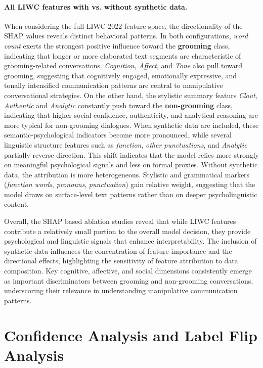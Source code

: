 \paragraph{All LIWC features with vs. without synthetic data.}
When considering the full LIWC-2022 feature space, the directionality of the SHAP values reveals distinct behavioral patterns. In both configurations, \textit{word count} exerts the strongest positive influence toward the \textbf{grooming} class, indicating that longer or more elaborated text segments are characteristic of grooming-related conversations. \textit{Cognition}, \textit{Affect}, and \textit{Tone} also pull toward grooming, suggesting that cognitively engaged, emotionally expressive, and tonally intensified communication patterns are central to manipulative conversational strategies. On the other hand, the stylistic summary featurs \textit{Clout}, \textit{Authentic} and \textit{Analytic} constantly push toward the \textbf{non-grooming} class, indicating that higher social confidence, authenticity, and analytical reasoning are more typical for non-grooming dialogues. When synthetic data are included, these semantic-psychological indicators become more pronounced, while several linguistic structure features such as \textit{function}, \textit{other punctuations}, and \textit{Analytic} partially reverse direction. This shift indicates that the model relies more strongly on meaningful psychological signals and less on formal proxies. Without synthetic data, the attribution is more heterogeneous. Stylistic and grammatical markers (\textit{function words}, \textit{pronouns}, \textit{punctuation}) gain relative weight, suggesting that the model draws on surface-level text patterns rather than on deeper psycholinguistic content.

Overall, the SHAP based ablation studies reveal that while LIWC features contribute a relatively small portion to the overall model decision, they provide psychological and linguistic signals that enhance interpretability. The inclusion of synthetic data influences the concentration of feature importance and the directional effects, highlighting the sensitivity of feature attribution to data composition. Key cognitive, affective, and social dimensions consistently emerge as important discriminators between grooming and non-grooming conversations, underscoring their relevance in understanding manipulative communication patterns.


\section{Confidence Analysis and Label Flip Analysis} \label{sec:confidence_and_label_flip_analysis}

